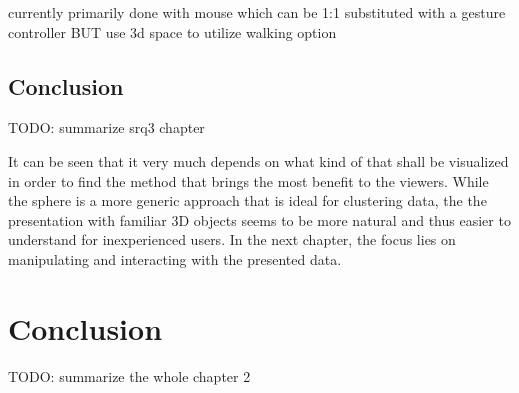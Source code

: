 currently primarily done with mouse which can be 1:1 substituted with a gesture controller
BUT use 3d space to utilize walking option



\subsection{Conclusion}

TODO: summarize srq3 chapter

It can be seen that it very much depends on what kind of that shall be visualized in order to find the method that brings the most benefit to the viewers. While the sphere is a more generic approach that is ideal for clustering data, the the presentation with familiar 3D objects seems to be more natural and thus easier to understand for inexperienced users. In the next chapter, the focus lies on manipulating and interacting with the presented data.




\section{Conclusion}

\label{SectionLiteratureReviewConclusion}

TODO: summarize the whole chapter 2

